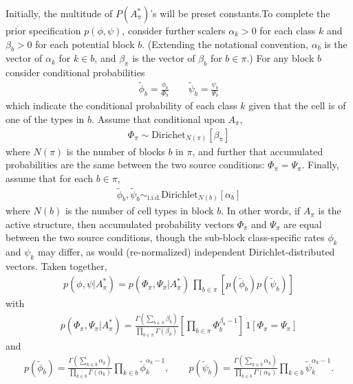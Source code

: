 \documentclass[11pt]{amsart}
\begin{document}
Initially, the multitude of $P(A_\pi^*)$'s will be preset constants.To complete the prior specification $p(\phi,\psi)$, consider further scalers
$\alpha_k>0$ for each class $k$ and $\beta_b>0$ for each potential block $b$.
(Extending the notational convention, $\alpha_b$ is the vector of $\alpha_k$
for $k\in b$, and $\beta_\pi$ is the vector of $\beta_b$ for $b \in \pi$.)
For any block $b$ consider conditional probabilities
\begin{eqnarray*}
\tilde{\phi}_b = \frac{\phi_b}{\Phi_b} \qquad \tilde{\psi}_b = \frac{\psi_b}{\Psi_b}
\end{eqnarray*}
which indicate the conditional probability of each class $k$ given that
the cell is of one of the types in $b$.  Assume that conditional upon 
$A_\pi$,
\begin{eqnarray*}
\Phi_\pi \sim \text{Dirichet}_{N(\pi)}[   \beta_\pi   ]
\end{eqnarray*}
where $N(\pi)$ is the number of blocks $b$ in $\pi$,
and further that accumulated probabilities are the same between
the two source conditions: $\Phi_\pi = \Psi_\pi$.
Finally, assume that for each $b \in \pi$,
\begin{eqnarray*}
\tilde \phi_b, \tilde \psi_b \sim_{\text{i.i.d.}}
  \text{Dirichlet}_{N(b)}[ \alpha_b ]
\end{eqnarray*}
where $N(b)$ is the number of cell types in block $b$.
In other words, if $A_\pi$ is the active structure, then
accumulated probability vectors $\Phi_\pi$ and $\Psi_\pi$ are equal
between the two source conditions, though the sub-block class-specific
rates $\phi_k$ and $\psi_k$ may differ, as would (re-normalized)
independent Dirichlet-distributed vectors.
Taken together,
\begin{eqnarray*}
p(\phi,\psi|A^*_\pi) =
         p( \Phi_\pi, \Psi_\pi | A^*_\pi ) \, \prod_{b \in \pi}  \left[
         p( \tilde \phi_b ) p( \tilde \psi_b ) \right]
\end{eqnarray*}
with
\begin{eqnarray*}
p( \Phi_\pi, \Psi_\pi | A^*_\pi )
= \frac{\Gamma(\sum_{b\in \pi} \beta_b)}{
 \prod_{b \in \pi} \Gamma( \beta_b )} \left[\prod_{b \in \pi} \Phi_b^{\beta_b-1} \right] \,
 1\left[ \Phi_\pi = \Psi_\pi \right]
\end{eqnarray*}
and
\begin{eqnarray*}
p( \tilde \phi_b ) =
\frac{ \Gamma( \sum_{k\in b} \alpha_k ) }{ \prod_{k\in b} \Gamma(\alpha_k) }
 \prod_{k \in b} \tilde \phi_k^{\alpha_k -1 },
\qquad
p( \tilde \psi_b )
=
\frac{ \Gamma( \sum_{k\in b} \alpha_k ) }{ \prod_{k\in b} \Gamma(\alpha_k) }
\prod_{k \in b} \tilde \psi_k^{\alpha_k -1 }.
\end{eqnarray*}
\end{document}
